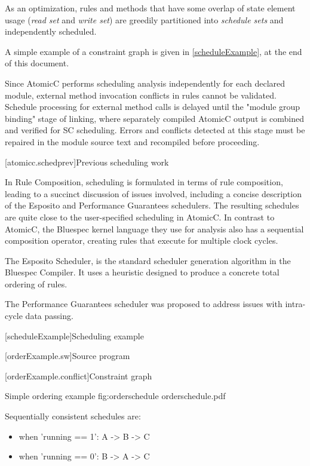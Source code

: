 As an optimization, rules and methods that have some overlap of state element usage
(\textit{read set} and \textit{write set})
are greedily partitioned into \textit{schedule sets}
and independently scheduled.

A simple example of a constraint graph is given in \ref{scheduleExample}, at the end of this document.

Since AtomicC performs scheduling analysis independently for each
declared module, external method invocation conflicts in rules cannot be validated.
Schedule processing for external method calls is delayed until the "module group binding"
stage of linking, where separately compiled AtomicC output is combined and
verified
for SC scheduling.  Errors and conflicts detected at this stage must be repaired
in the module source text and recompiled before proceeding.

[atomicc.schedprev]{Previous scheduling work}

In Rule Composition\cite{Dave2007}, scheduling
is formulated in terms of rule composition, leading to a succinct discussion
of issues involved, including a concise description of the Esposito and
Performance Guarantees schedulers.  The resulting schedules are quite close
to the user-specified scheduling in AtomicC.
In contrast to AtomicC, the Bluespec kernel language they use
for analysis also has a sequential composition operator, creating rules
that execute for multiple clock cycles.

The Esposito Scheduler\cite{Esposito:Patent,Dave2007},
is the standard scheduler generation algorithm in the Bluespec Compiler.
It uses a heuristic designed to produce a concrete total ordering of rules.

The Performance Guarantees scheduler\cite{Rosenband:PerformanceGuarantees}
was proposed to address issues with intra-cycle data passing.


[scheduleExample]{Scheduling example}{}

[orderExample.sw]{Source program}



[orderExample.conflict]{Constraint graph}

\begin{importgraphic}
{Simple ordering example}
{fig:orderschedule}
{orderschedule.pdf}
\end{importgraphic}

Sequentially consistent schedules are:
\begin{itemize}[noitemsep,topsep=0pt]
\item when 'running == 1': A -> B -> C
\item when 'running == 0': B -> A -> C
\end{itemize}

